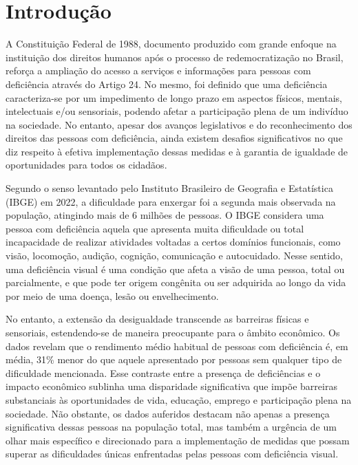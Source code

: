 \chapter{Introdução}
\label{cap:introducao}


A Constituição Federal de 1988, documento produzido com grande enfoque na instituição dos direitos humanos após o processo de redemocratização no Brasil, reforça a ampliação do acesso a serviços e informações para pessoas com deficiência através do Artigo 24. No mesmo, foi definido que uma deficiência caracteriza-se por um impedimento de longo prazo em aspectos físicos, mentais, intelectuais e/ou sensoriais, podendo afetar a participação plena de um indivíduo na sociedade. No entanto, apesar dos avanços legislativos e do reconhecimento dos direitos das pessoas com deficiência, ainda existem desafios significativos no que diz respeito à efetiva implementação dessas medidas e à garantia de igualdade de oportunidades para todos os cidadãos.

Segundo o senso levantado pelo Instituto Brasileiro de Geografia e Estatística (IBGE) em 2022, a dificuldade para enxergar foi a segunda mais observada na população, atingindo mais de 6 milhões de pessoas. O IBGE considera uma pessoa com deficiência aquela que apresenta muita dificuldade ou total incapacidade de realizar atividades voltadas a certos domínios funcionais, como visão, locomoção, audição, cognição, comunicação e autocuidado. Nesse sentido, uma deficiência visual é uma condição que afeta a visão de uma pessoa, total ou parcialmente, e que pode ter origem congênita ou ser adquirida ao longo da vida por meio de uma doença, lesão ou envelhecimento.

No entanto, a extensão da desigualdade transcende as barreiras físicas e sensoriais, estendendo-se de maneira preocupante para o âmbito econômico. Os dados revelam que o rendimento médio habitual de pessoas com deficiência é, em média, 31\% menor do que aquele apresentado por pessoas sem qualquer tipo de dificuldade mencionada. Esse contraste entre a presença de deficiências e o impacto econômico sublinha uma disparidade significativa que impõe barreiras substanciais às oportunidades de vida, educação, emprego e participação plena na sociedade. Não obstante, os dados auferidos destacam não apenas a presença significativa dessas pessoas na população total, mas também a urgência de um olhar mais específico e direcionado para a implementação de medidas que possam superar as dificuldades únicas enfrentadas pelas pessoas com deficiência visual.

